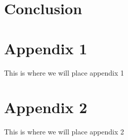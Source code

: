 \documentclass[12pt,a4paper,twoside,openright]{report}
\begin{document}
\chapter{Conclusion}
    

\cleardoublepage
{}



\cleardoublepage
\begin{appendices}
    \setcounter{page}{1}
    \chapter{Appendix 1}
        This is where we will place appendix 1
    
    \chapter{Appendix 2}
        This is where we will place appendix 2
\end{appendices}
\end{document}
